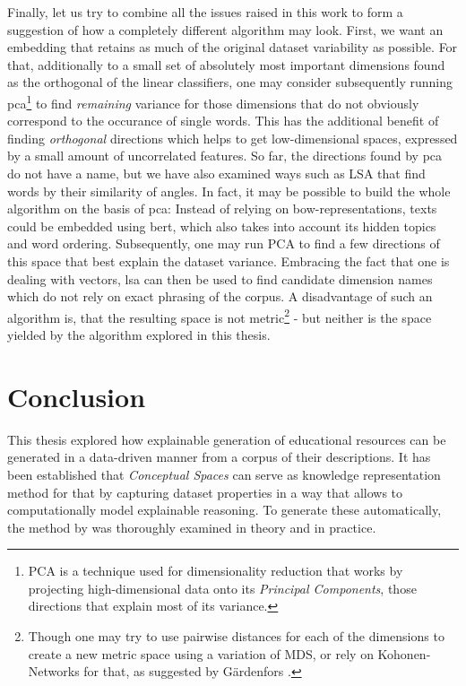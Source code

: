 Finally, let us try to combine all the issues raised in this work to form a suggestion of how a completely different algorithm may look.
First, we want an embedding that retains as much of the original dataset variability as possible. For that, additionally to a small set of absolutely most important dimensions found as the orthogonal of the linear classifiers, one may consider subsequently running \gls{pca}\footnote{PCA is a technique used for dimensionality reduction that works by projecting high-dimensional data onto its \textit{Principal Components}, those directions that explain most of its variance.} to find \textit{remaining} variance for those dimensions that do not obviously correspond to the occurance of single words. This has the additional benefit of finding \textit{orthogonal} directions which helps to get low-dimensional spaces, expressed by a small amount of uncorrelated features. So far, the directions found by \gls{pca} do not have a name, but we have also examined ways such as LSA that find words by their similarity of angles. In fact, it may be possible to build the whole algorithm on the basis of \gls{pca}: Instead of relying on \gls{bow}-representations, texts could be embedded using \eg \gls{bert}, which also takes into account its hidden topics and word ordering. Subsequently, one may run PCA to find a few directions of this space that best explain the dataset variance. Embracing the fact that one is dealing with vectors, \gls{lsa} can then be used to find candidate dimension names which do not rely on exact phrasing of the corpus. A disadvantage of such an algorithm is, that the resulting space is not metric\footnote{Though one may try to use pairwise distances for each of the dimensions to create a new metric space using a variation of MDS, or rely on Kohonen-Networks for that, as suggested by Gärdenfors \cite{Gardenfors2000a}.} - but neither is the space yielded by the algorithm explored in this thesis.




\section{Conclusion}

This thesis explored how explainable generation of educational resources can be generated in a data-driven manner from a corpus of their descriptions. It has been established that \textit{Conceptual Spaces} can serve as knowledge representation method for that by capturing dataset properties in a way that allows to computationally model explainable reasoning. To generate these automatically, the method by \cite{Derrac2015} was thoroughly examined in theory and in practice.

